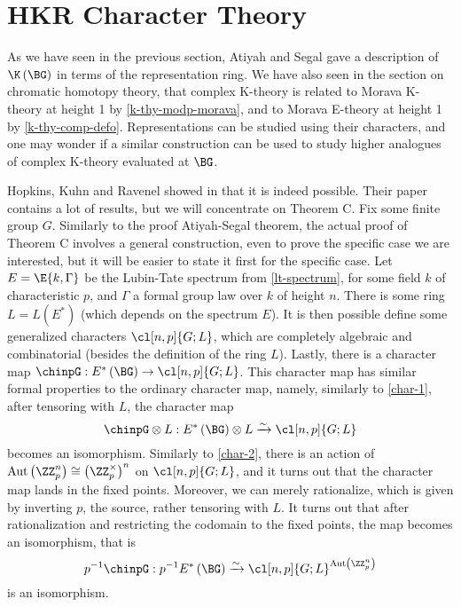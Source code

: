 \section{HKR Character Theory}

As we have seen in the previous section, Atiyah and Segal gave a description of $\K\left(\BG\right)$ in terms of the representation ring.
We have also seen in the section on chromatic homotopy theory, that complex K-theory is related to Morava K-theory at height 1 by \ref{k-thy-modp-morava}, and to Morava E-theory at height 1 by \ref{k-thy-comp-defo}.
Representations can be studied using their characters, and one may wonder if a similar construction can be used to study higher analogues of complex K-theory evaluated at $\BG$.

Hopkins, Kuhn and Ravenel showed in \cite{HKR} that it is indeed possible.
Their paper contains a lot of results, but we will concentrate on Theorem C.
Fix some finite group $G$.
Similarly to the proof Atiyah-Segal theorem, the actual proof of Theorem C involves a general construction, even to prove the specific case we are interested, but it will be easier to state it first for the specific case.
Let $E = \E{k, \Gamma}$ be the Lubin-Tate spectrum from \ref{lt-spectrum}, for some field $k$ of characteristic $p$, and $\Gamma$ a formal group law over $k$ of height $n$. 
There is some ring $L = L\left(E^*\right)$ (which depends on the spectrum $E$).
It is then possible define some generalized characters $\cl[n,p]{G; L}$, which are completely algebraic and combinatorial (besides the definition of the ring $L$).
Lastly, there is a character map $\chinpG: E^*\left(\BG\right) \to \cl[n,p]{G; L}$.
This character map has similar formal properties to the ordinary character map, namely, similarly to \ref{char-1}, after tensoring with $L$, the character map
$$
\chinpG \otimes L:
E^*\left(\BG\right) \otimes L
\xrightarrow{\sim} \cl[n,p]{G; L}
$$
becomes an isomorphism.
Similarly to \ref{char-2}, there is an action of $\aut\left(\ZZ_p^n\right) \cong \left(\ZZ_p^\times\right)^n$ on $\cl[n,p]{G; L}$, and it turns out that the character map lands in the fixed points.
Moreover, we can merely rationalize, which is given by inverting $p$, the source, rather tensoring with $L$.
It turns out that after rationalization and restricting the codomain to the fixed points, the map becomes an isomorphism, that is
$$
p^{-1} \chinpG:
p^{-1} E^*\left(\BG\right)
\xrightarrow{\sim} \cl[n,p]{G; L}^{\aut\left(\ZZ_p^n\right)}
$$
is an isomorphism.

